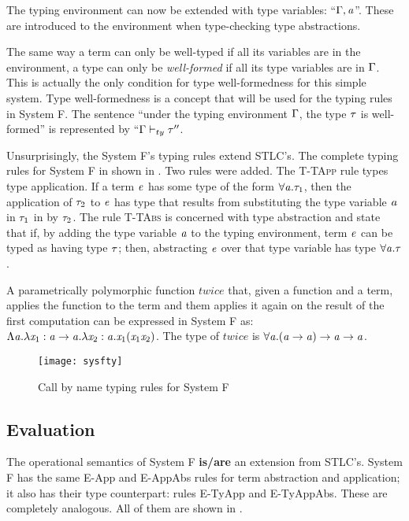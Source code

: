 The typing environment can now be extended with type variables: ``$\Gamma,\mathit{a}$''. These are introduced to the environment when type-checking type abstractions.

The same way a term can only be well-typed if all its variables are in the environment, a type can only be \textit{well-formed} if all its type variables are in $\Gamma$. This is actually the only condition for type well-formedness for this simple system. Type well-formedness is a concept that will be used for the typing rules in System F. The sentence ``under the typing environment $\Gamma$, the type $\mathit{\tau}$ is well-formed'' is represented by ``$\Gamma \vdash_{ty} \mathit{\tau}''$.

Unsurprisingly, the System F's typing rules extend STLC's. The complete typing rules for System F in shown in . Two rules were added. The \textsc{T-TApp} rule types type application. If a term $\mathit{e}$ has some type of the form $\forall {\mathit{a}} . {\mathit{\tau}_1}$, then the application of $\mathit{\tau}_2$ to $\mathit{e}$ has type that results from substituting the type variable $\mathit{a}$ in $\mathit{\tau}_1$ in by $\mathit{\tau}_2$. The rule \textsc{T-TAbs} is concerned with type abstraction and state that if, by adding the type variable $\mathit{a}$ to the typing environment, term $\mathit{e}$ can be typed as having type $\mathit{\tau}$; then, abstracting $\mathit{e}$ over that type variable has type $\forall {\mathit{a}} . {\mathit{\tau}}$.

A parametrically polymorphic function $twice$ that, given a function and a term, applies the function to the term and them applies it again on the result of the first computation can be expressed in System F as: $\Lambda \mathit{a}. \lambda \mathit{x}_1: \mathit{a} \rightarrow \mathit{a} . \lambda \mathit{x}_2:\mathit{a}. \mathit{x}_1 (\mathit{x}_1 \mathit{x}_2)$. The type of $twice$ is $\forall {\mathit{a}} . {(\mathit{a} \rightarrow \mathit{a}) \rightarrow \mathit{a} \rightarrow \mathit{a}}$.

\begin{figure}
  \centering
  \texttt{[image: sysfty]}
  \caption{Call by name typing rules for System F}
  \label{sysfty}
\end{figure}
\subsection{Evaluation}
The operational semantics of System F \textbf{is/are} an extension from STLC's. System F has the same E-App and E-AppAbs rules for term abstraction and application; it also has their type counterpart: rules E-TyApp and E-TyAppAbs. These are completely analogous. All of them are shown in .

